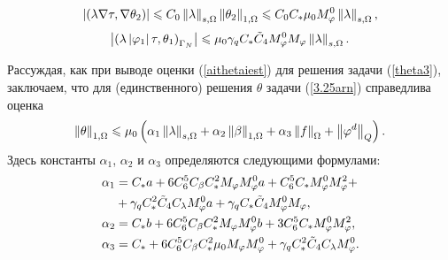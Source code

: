 \[
	\left\vert 
		\left( 
			\lambda \nabla \tau, \nabla \theta_2
		 \right)
	 \right\vert \leqslant 
		C_0 
		\left\Vert \lambda \right\Vert_{s,\Omega}
		\left\Vert \theta_2 \right\Vert_{1,\Omega} 
	\leqslant 
		C_0 C_{*} 
		\mu_0 M_\varphi^0 
		\left\Vert \lambda \right\Vert_{s,\Omega},
\]
\[
	\left\vert \left( \lambda \left\vert \varphi_1 \right\vert \tau, \theta_1 \right)_{\Gamma_N} \right\vert 
	\leqslant 
	\mu_0 \gamma_q 
	C_{*}\tilde C_4 
	M_\varphi^0 M_\varphi 
	\left\Vert \lambda \right\Vert_{s,\Omega}.
\]

Рассуждая, как при выводе оценки (\ref{aithetaiest}) для решения задачи (\ref{theta3}), заключаем, что для (единственного) решения $\theta$ задачи (\ref{3.25arn}) справедлива оценка
\begin{equation}
	\label{3.25brn}
	\left\Vert \theta \right\Vert_{1,\Omega} 
	\leqslant  
		\mu_0 
		\left( 
			\alpha_1 \left\Vert \lambda \right\Vert_{s,\Omega} 
			+ \alpha_2 \left\Vert \beta \right\Vert_{1,\Omega} 
			+ \alpha_3 \left\Vert f \right\Vert_\Omega 
			+ \left\Vert \varphi^d \right\Vert_Q 
		 \right).
\end{equation}
Здесь константы $\alpha_1$, $\alpha_2$ и $\alpha_3$ определяются следующими формулами:
\begin{equation}
	\label{3.25crn}
	\begin{split}
		\alpha_1 &= C_{*} a 
		+ 6 C_6^5 C_\beta C_{*}^2 
			M_\varphi M_\varphi^0 a 
		+ C_6^5 C_{*} 
			M_\varphi^0 M_\varphi^2 + \\ 
		&+ \gamma_q 
			C_{*}^2 \tilde C_4 C_\lambda 
			M_\varphi^0 a
		+ \gamma_q 
			C_{*} \tilde C_4 
			M_\varphi^0 M_\varphi, \\
		\alpha_2 &= C_{*} b 
		+ 6 C_6^5 C_\beta C_{*}^2 
			M_\varphi M_\varphi^0 b 
		+ 3 C_6^5 C_{*} 
			M_\varphi^0 M_\varphi^2, \\
		\alpha_3 &= C_{*} 
		+ 6 C^5_6 C_\beta C^2_{*} 
			\mu_0 M_\varphi M_\varphi^0 
		+ \gamma_q 
			C_{*}^2 \tilde C_4 C_\lambda 
			M_\varphi^0.
	\end{split}
\end{equation}

